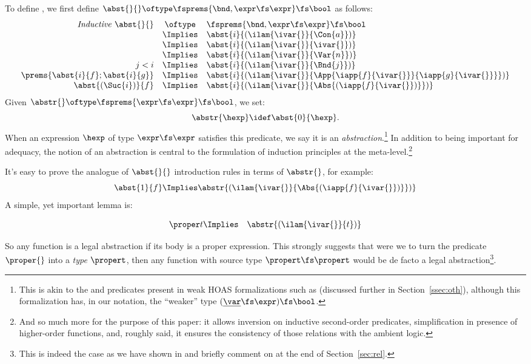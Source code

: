 \documentclass[final]{svjour3}
\begin{document}
To define , we first define $\abst{}{} \oftype
\fsprems{\bnd,\expr\fs\expr} \fs\bool$  as follows:
 \[
 \begin{array}{rcl}
\mathit{Inductive}\ \abst{}{} &\oftype& \fsprems{\bnd,\expr\fs\expr} \fs
 \bool\\
   & \Implies & \abst{i}{(\ilam{\ivar{}}{\Con{a}})} \\
   & \Implies & \abst{i}{(\ilam{\ivar{}}{\ivar{}})} \\
   & \Implies & \abst{i}{(\ilam{\ivar{}}{\Var{n}})} \\
   j < i  & \Implies & 
   \abst{i}{(\ilam{\ivar{}}{\Bnd{j}})} \\
   \prems{\abst{i}{f} ; \abst{i}{g}} & \Implies &  
   \abst{i}{(\ilam{\ivar{}}{\App{\iapp{f}{\ivar{}}}{\iapp{g}{\ivar{}}}})}\\ 
   \abst{(\Suc{i})}{f} & \Implies & 
   \abst{i}{(\ilam{\ivar{}}{\Abs{(\iapp{f}{\ivar{}})}})}  \end{array}
 \]
Given  $\abstr{} \oftype \fsprems{\expr\fs\expr} \fs \bool$, 
we set:
$$\abstr{\hexp} \idef \abst{0}{\hexp}.$$
When an expression $\hexp$ of type $\expr\fs\expr$ satisfies this
predicate, we say it is an \emph{abstraction}.\footnote{This is akin
to the  and  predicates present in weak
HOAS formalizations such as \cite{DFHtlca95} (discussed further in
Section~\ref{ssec:oth}), although this formalization has,
in our notation, the ``weaker'' type
$(\underline\var\fs\expr)\fs\bool$.}  In addition to being
important for adequacy, the notion of an abstraction is central to the
formulation of induction principles at the meta-level.\footnote{And
so much more for the purpose of this paper: it allows inversion on
inductive second-order predicates, simplification in presence of
higher-order functions, and, roughly said, it ensures the consistency of
those relations with the ambient logic.}

It's easy to prove the analogue of $\abst{}{}$ introduction rules in
terms of $ \abstr{}$, for example:
$$\abst{1}{f} \Implies
\abstr{(\ilam{\ivar{}}{\Abs{(\iapp{f}{\ivar{}})}})}$$ A simple, yet
important lemma is:
\begin{mclemma}
  \begin{eqnarray*}
    \proper t &\Implies & \abstr{(\ilam{\ivar{}}{t})}
  \end{eqnarray*}
\label{mclem:proper_abst}
\end{mclemma}
So any function is a legal abstraction if its body is a proper
expression. This strongly suggests that were we to turn the predicate
$\proper{}$ into a \emph{type} $\propert$, then any function with source type
$\propert\fs\propert$ would be de facto a legal
abstraction\footnote{This is indeed the case as we have shown in
  \cite{MMF07} and briefly comment on at the end of
  Section~\ref{sec:rel}.}.
\end{document}
